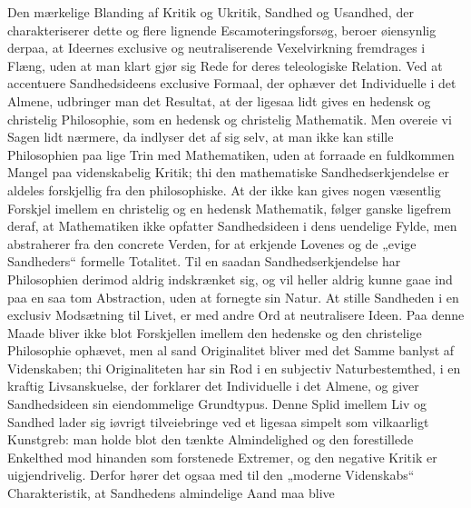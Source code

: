 \documentclass[12pt]{book}
\newcommand{\opage}[1]{\marginnote{\footnotesize\textit{[#1]}}}
\begin{document}
Den mærkelige Blanding af Kritik og Ukritik, Sandhed og Usandhed, der charakteriserer
dette og flere lignende Escamoteringsforsøg, beroer øiensynlig derpaa, at Ideernes
exclusive og neutraliserende Vexelvirkning fremdrages i Flæng, uden at man klart gjør sig
Rede for deres teleologiske Relation. Ved at accentuere Sandhedsideens exclusive Formaal,
der ophæver det Individuelle i det Almene, udbringer man det Resultat, at der ligesaa
lidt gives en hedensk og christelig Philosophie, som en hedensk og christelig Mathematik.
Men overeie vi Sagen lidt nærmere, da indlyser det af sig selv, at man ikke kan stille
Philosophien paa lige Trin med Mathematiken, uden at forraade en fuldkommen Mangel paa
videnskabelig Kritik; thi den mathematiske Sandhedserkjendelse er aldeles forskjellig fra
den philosophiske. At der ikke kan gives nogen væsentlig Forskjel imellem en christelig
og en hedensk Mathematik, følger ganske ligefrem deraf, at Mathematiken ikke opfatter
Sandhedsideen i dens uendelige Fylde, men abstraherer fra den concrete Verden, for at
erkjende Lovenes og de „evige Sandheders“ formelle Totalitet. Til en saadan
Sandhedserkjendelse har Philosophien derimod aldrig indskrænket sig, og vil heller aldrig
kunne gaae ind paa en saa tom Abstraction, uden at fornegte sin Natur. At stille
Sandheden i en exclusiv Modsætning til Livet, er med andre Ord at neutralisere Ideen. Paa
denne Maade bliver ikke blot Forskjellen imellem den hedenske og den christelige
Philosophie ophævet, men al sand Originalitet bliver med det Samme banlyst af
Videnskaben; thi Originaliteten har sin Rod i en subjectiv Naturbestemthed, i en kraftig
Livsanskuelse, der forklarer det Individuelle i det Almene, og giver Sandhedsideen
\opage{265} sin eiendommelige Grundtypus. Denne Splid imellem Liv og Sandhed lader sig iøvrigt
tilveiebringe ved et ligesaa simpelt som vilkaarligt Kunstgreb: man holde blot den
tænkte Almindelighed og den forestillede Enkelthed mod hinanden som forstenede
Extremer, og den negative Kritik er uigjendrivelig. Derfor hører det ogsaa med til
den „moderne Videnskabs“ Charakteristik, at Sandhedens almindelige Aand maa blive
\end{document}
